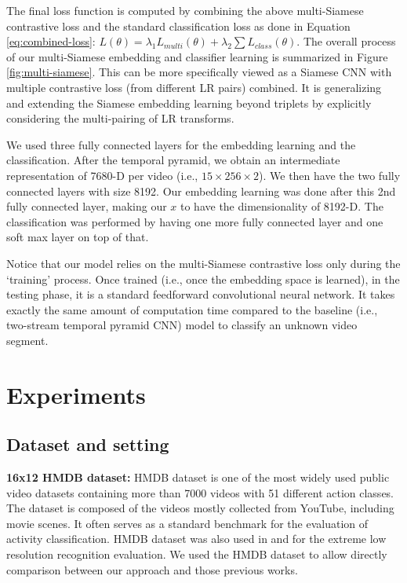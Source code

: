 \documentclass[letterpaper]{article} %
\begin{document}
The final loss function is computed by combining the above multi-Siamese contrastive loss and the standard classification loss as done in Equation \ref{eq:combined-loss}: $L(\theta)= \lambda_1 L_{multi}(\theta) + \lambda_2 \sum L_{class}(\theta)$. The overall process of our multi-Siamese embedding and classifier learning is summarized in Figure \ref{fig:multi-siamese}. This can be more specifically viewed as a Siamese CNN with multiple contrastive loss (from different LR pairs) combined. It is generalizing and extending the Siamese embedding learning beyond triplets by explicitly considering the multi-pairing of LR transforms.

We used three fully connected layers for the embedding learning and the classification. After the temporal pyramid, we obtain an intermediate representation of 7680-D per video (i.e., $15 \times 256 \times 2$). We then have the two fully connected layers with size 8192. Our embedding learning was done after this 2nd fully connected layer, making our $x$ to have the dimensionality of 8192-D. The classification was performed by having one more fully connected layer and one soft max layer on top of that.

Notice that our model relies on the multi-Siamese contrastive loss only during the `training' process. Once trained (i.e., once the embedding space is learned), in the testing phase, it is a standard feedforward convolutional neural network. It takes exactly the same amount of computation time compared to the baseline (i.e., two-stream temporal pyramid CNN) model to classify an unknown video segment.

\section{Experiments}

\subsection{Dataset and setting}

{\flushleft\textbf{16x12 HMDB dataset:} HMDB dataset \cite{hmdb} is one of the most widely used public video datasets containing more than 7000 videos with 51 different action classes. The dataset is composed of the videos mostly collected from YouTube, including movie scenes. It often serves as a standard benchmark for the evaluation of activity classification. HMDB dataset was also used in \cite{ryoo17privacy} and \cite{chen17} for the extreme low resolution recognition evaluation. We used the HMDB dataset to allow directly comparison between our approach and those previous works.}
\end{document}
